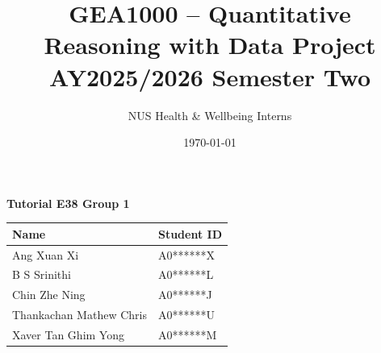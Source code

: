 \title{GEA1000 -- Quantitative Reasoning with Data Project\\
AY2025/2026 Semester Two}
\date{\today}
\author{NUS Health \& Wellbeing Interns}

\maketitle

\vspace{1em}

\begin{center}
\textbf{Tutorial E38 Group 1}

\vspace{0.5em}

\begin{tabular}{p{8cm} l}
\toprule
\textbf{Name} & \textbf{Student ID} \\
\midrule
Ang Xuan Xi & A0******X \\
B S Srinithi & A0******L \\
Chin Zhe Ning & A0******J \\
Thankachan Mathew Chris & A0******U \\
Xaver Tan Ghim Yong & A0******M \\
\bottomrule
\end{tabular}
\end{center}

\newpage
